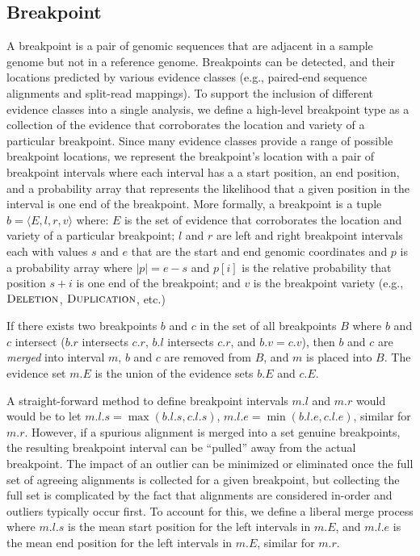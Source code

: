 \documentclass[10pt]{bmc_article}
\newenvironment{bmcformat}{\begin{raggedright}\baselineskip20pt\sloppy\setboolean{publ}{false}}{\end{raggedright}\baselineskip20pt\sloppy}
\begin{document}
\begin{bmcformat}
\subsection*{Breakpoint}

A breakpoint is a pair of genomic sequences that are adjacent in a sample genome
but not in a reference genome. Breakpoints can be detected, and their locations
predicted by various evidence classes (e.g., paired-end sequence alignments and
split-read mappings).  To support the inclusion of different evidence classes
into a single analysis, we define a high-level breakpoint type as a collection
of the evidence that corroborates the location and variety of a particular
breakpoint.  Since many evidence classes provide a range of possible breakpoint
locations, we represent the breakpoint's location with a pair of breakpoint
intervals where each interval has a a start position, an end position, and a
probability array that represents the likelihood that a given position in the
interval is one end of the breakpoint.  More formally, a breakpoint is a tuple
$b=\langle E,l,r,v \rangle$ where: $E$ is the set of evidence that corroborates
the location and variety of a particular breakpoint; $l$ and $r$ are left and
right breakpoint intervals each with values $s$ and $e$ that are the start and
end genomic coordinates and $p$ is a probability array where $|p|=e-s$ and
$p[i]$ is the relative probability that position $s+i$ is one end of the
breakpoint; and $v$ is the breakpoint variety (e.g., $\textsc{Deletion}$,
$\textsc{Duplication}$, etc.)

If there exists two breakpoints $b$ and $c$ in the set of all breakpoints $B$
where $b$ and $c$  intersect ($b.r$ intersects $c.r$, $b.l$ intersects $c.r$,
and $b.v = c.v$), then $b$ and $c$ are {\em merged} into interval $m$, $b$ and
$c$ are removed from $B$, and $m$ is placed into $B$.  The evidence set $m.E$ is
the union of the evidence sets $b.E$ and $c.E$.  

A straight-forward method to define breakpoint intervals $m.l$ and $m.r$ would
would be to let $m.l.s = \max(b.l.s, c.l.s)$, $m.l.e = \min(b.l.e, c.l.e)$,
similar for $m.r$.  However, if a spurious alignment is merged into a set
genuine breakpoints, the resulting breakpoint interval can be ``pulled'' away
from the actual breakpoint.  The impact of an outlier can be minimized or
eliminated once the full set of agreeing alignments is collected for a given
breakpoint, but collecting the full set is complicated by the fact that
alignments are considered in-order and outliers typically occur first.  To
account for this, we define a liberal merge process where $m.l.s$ is the mean
start position for the left intervals in $m.E$, and  $m.l.e$ is the mean
end position for the left intervals in $m.E$, similar for $m.r$.


\end{bmcformat}
\end{document}
